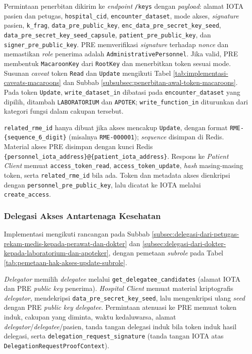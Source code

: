 Permintaan penerbitan dikirim ke \textit{endpoint} \texttt{/keys} dengan \textit{payload}: alamat IOTA pasien dan petugas, \texttt{hospital\_cid}, \texttt{encounter\_dataset}, mode akses, \textit{signature} pasien, \texttt{k\_frag}, \texttt{data\_pre\_public\_key}, \texttt{enc\_data\_pre\_secret\_key\_seed}, \texttt{data\_pre\_secret\_key\_seed\_capsule}, \texttt{patient\_pre\_public\_key}, dan \texttt{signer\_pre\_public\_key}. PRE memverifikasi \textit{signature} terhadap \textit{nonce} dan memastikan \textit{role} penerima adalah \texttt{AdministrativePersonnel}. Jika valid, PRE membentuk \texttt{MacaroonKey} dari \texttt{RootKey} dan menerbitkan token sesuai mode. Susunan \textit{caveat} token \texttt{Read} dan \texttt{Update} mengikuti Tabel \ref{tab:implementasi-caveats-macaroons} dan Subbab \ref{subsubsec:penerbitan-awal-token-macaroons}. Pada token \texttt{Update}, \texttt{write\_dataset\_in} dibatasi pada \texttt{encounter\_dataset} yang dipilih, ditambah \texttt{LABORATORIUM} dan \texttt{APOTEK}; \texttt{write\_function\_in} diturunkan dari kategori fungsi dalam cakupan tersebut.

\texttt{related\_rme\_id} hanya dibuat jika akses mencakup \texttt{Update}, dengan format \verb|RME-{sequence_6_digit}| (misalnya \verb|RME-000001|); \textit{sequence} disimpan di Redis. Material akses PRE disimpan dengan kunci Redis \verb|{personnel_iota_address}@{patient_iota_address}|. Respons ke \textit{Patient Client} memuat \texttt{access\_token\_read}, \texttt{access\_token\_update}, \textit{hash} masing-masing token, serta \texttt{related\_rme\_id} bila ada. Token dan metadata akses dienkripsi dengan \texttt{personnel\_pre\_public\_key}, lalu dicatat ke IOTA melalui \texttt{create\_access}.

\subsubsection{Delegasi Akses Antartenaga Kesehatan}
\label{subsubsec:delegasi-akses-antar-tenaga-kesehatan}

Implementasi mengikuti rancangan pada Subbab \ref{subsec:delegasi-dari-petugas-rekam-medis-kepada-perawat-dan-dokter} dan \ref{subsec:delegasi-dari-dokter-kepada-laboratorium-dan-apoteker}, dengan pemetaan \textit{subrole} pada Tabel \ref{tab:pemetaan-hak-akses-update-subrole}.

\textit{Delegator} memilih \textit{delegatee} melalui \texttt{get\_delegatee\_candidates} (alamat IOTA dan PRE \textit{public key} penerima). \textit{Hospital Client} memuat material kriptografis \textit{delegator}, mendekripsi \texttt{data\_pre\_secret\_key\_seed}, lalu mengenkripsi ulang \textit{seed} dengan PRE \textit{public key} \textit{delegatee}. Permintaan atenuasi ke PRE memuat token induk, cakupan yang diminta, waktu kedaluwarsa, alamat \textit{delegator}/\textit{delegatee}/pasien, tanda tangan delegasi induk bila token induk hasil delegasi, serta \texttt{delegation\_request\_signature} (tanda tangan IOTA atas \texttt{DelegationRequestProofContext}).

